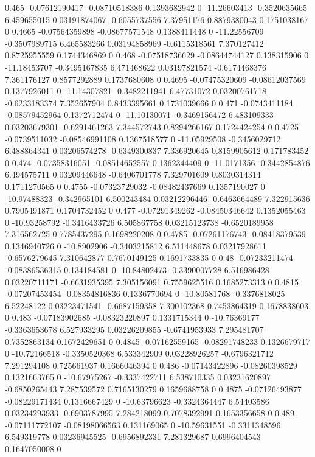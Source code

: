 {0.465 -0.07612190417 -0.08710518386 0.1393682942 0 -11.26603413 -0.3520635665 6.459655015 0.03191874067 -0.6055737556 7.37951176 0.8879380043 0.1751038167 0
0.4665 -0.07564359898 -0.08677571548 0.1388411448 0 -11.22556709 -0.3507989715 6.465583266 0.03194858969 -0.6115318561 7.370127412 0.8725955559 0.1744346869 0
0.468 -0.07518736629 -0.08644744127 0.138315906 0 -11.18453707 -0.3495167835 6.471468622 0.03197821574 -0.6174468376 7.361176127 0.8577292889 0.1737680608 0
0.4695 -0.07475320609 -0.08612037569 0.1377926011 0 -11.14307821 -0.3482211941 6.47731072 0.03200761718 -0.6233183374 7.352657904 0.8433395661 0.1731039666 0
0.471 -0.0743411184 -0.08579452964 0.1372712474 0 -11.10130071 -0.3469156472 6.483109333 0.03203679301 -0.6291461263 7.344572743 0.8294266167 0.1724424254 0
0.4725 -0.0739511032 -0.08546991108 0.1367518577 0 -11.05929508 -0.3456029712 6.488864341 0.03206574278 -0.6349300837 7.336920645 0.8159905612 0.171783452 0
0.474 -0.07358316051 -0.08514652557 0.1362344409 0 -11.0171356 -0.3442854876 6.494575711 0.03209446648 -0.6406701778 7.329701609 0.8030314314 0.1711270565 0
0.4755 -0.07323729032 -0.08482437669 0.1357190027 0 -10.97488323 -0.342965101 6.500243484 0.03212296446 -0.6463664489 7.322915636 0.7905491871 0.1704732452 0
0.477 -0.07291349262 -0.08450346642 0.1352055463 0 -10.93258792 -0.3416433726 6.505867758 0.03215123738 -0.6520189958 7.316562725 0.7785437295 0.1698220208 0
0.4785 -0.07261176743 -0.08418379539 0.1346940726 0 -10.8902906 -0.3403215812 6.511448678 0.03217928611 -0.6576279645 7.310642877 0.7670149125 0.1691733835 0
0.48 -0.07233211474 -0.08386536315 0.134184581 0 -10.84802473 -0.3390007728 6.516986428 0.03220711171 -0.6631935395 7.305156091 0.7559625516 0.1685273313 0
0.4815 -0.07207453454 -0.08354816836 0.1336770694 0 -10.80581768 -0.3376818025 6.52248122 0.03223471541 -0.6687159358 7.300102368 0.7453864319 0.1678838603 0
0.483 -0.07183902685 -0.08323220897 0.1331715344 0 -10.76369177 -0.3363653678 6.527933295 0.03226209855 -0.6741953933 7.295481707 0.7352863134 0.1672429651 0
0.4845 -0.07162559165 -0.08291748233 0.1326679717 0 -10.72166518 -0.3350520368 6.533342909 0.03228926257 -0.6796321712 7.291294108 0.725661937 0.1666046394 0
0.486 -0.07143422896 -0.08260398529 0.1321663765 0 -10.67975267 -0.3337422711 6.538710335 0.03231620897 -0.6850265443 7.287539572 0.7165130279 0.1659688758 0
0.4875 -0.07126493877 -0.08229171434 0.1316667429 0 -10.63796623 -0.3324364447 6.54403586 0.03234293933 -0.6903787995 7.284218099 0.7078392991 0.1653356658 0
0.489 -0.07111772107 -0.08198066563 0.131169065 0 -10.59631551 -0.3311348596 6.549319778 0.03236945525 -0.6956892331 7.281329687 0.6996404543 0.1647050008 0
}
